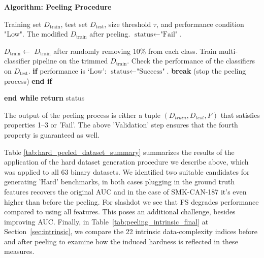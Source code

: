 \documentclass[preprint,12pt,authoryear]{elsarticle}
\begin{document}
{\small
\begin{mdframed}
\textbf{Algorithm: Peeling Procedure}
\begin{algorithmic}[1]
\REQUIRE Training set $D_{\text{train}}$, test set $D_{\text{test}}$, size threshold $\tau$, and performance condition "Low".
\ENSURE The modified $D_{\text{train}}$ after peeling.
\STATE  $\text{status} \gets \text{"Fail"}$.

    \STATE \hspace{5mm} $D_{\text{train}} \leftarrow$ $D_{\text{train}}$ after randomly removing 10\% from each class.
    \STATE \hspace{5mm} Train multi-classifier pipeline on the trimmed $D_{\text{train}}$.
    \STATE \hspace{5mm} Check the performance of the classifiers on $D_{\text{test}}$.
    \STATE \hspace{5mm} \textbf{if}  {performance is `Low':}
        \STATE \hspace{10mm} $\text{status} \gets \text{"Success"}$.
        \STATE \hspace{10mm} \textbf{break} (stop the peeling process)
    \STATE \hspace{5mm} \textbf{end if}

    \STATE \textbf{end while}  %
    \STATE \textbf{return} status %

\end{algorithmic}
\end{mdframed}
}


The output of the peeling process is either a tuple $(D_{train}, D_{test},F)$ that satisfies properties 1--3  or 'Fail'. The above 'Validation' step ensures that the fourth property is guaranteed as well.

Table \ref{tab:hard_peeled_dataset_summary} summarizes the results of the application of the hard dataset generation procedure we describe above, which was applied to all 63 binary datasets. We identified two suitable candidates for generating 'Hard' benchmarks, in both cases plugging in the ground truth features recovers the original AUC and in the case of SMK-CAN-187 it's even higher than before the peeling. For slashdot we see that FS degrades performance compared to using all features. This poses an additional challenge, besides improving AUC.  Finally, in Table~\ref{tab:peeling_intrinsic_final} at Section~\ref{sec:intrinsic}, we compare the 22 intrinsic data-complexity indices before and after peeling to examine how the induced hardness is reflected in these measures.
\end{document}
